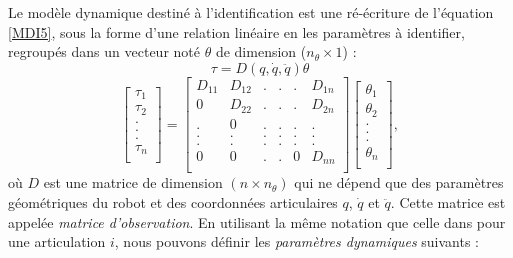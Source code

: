 \documentclass[12pt,a4paper,twoside]{report}
\begin{document}
Le modèle dynamique destiné à l'identification est une ré-écriture de l'équation \eqref{MDI5}, sous la forme d'une relation linéaire en les paramètres à identifier, regroupés dans un vecteur noté $\theta$ de dimension ($n_\theta \times 1$) :
\begin{equation}
\tau = D(q,\dot{q},\ddot{q}) \theta
\label{Reg1}
\end{equation}
\begin{equation}
\left[
\begin{array}{c}
\tau_1 \\
\tau_2 \\
. \\
. \\
. \\
\tau_n \\
\end{array}
\right] =
\left[
\begin{array}{cccccc}
D_{11} & D_{12} & . & . & . & D_{1n} \\
0 & D_{22} & . & . & . & D_{2n} \\
. & 0 & . & . & . & . \\
. & . & . & . & . & . \\
. & . & . & . & . & . \\
0 & 0 & . & . & 0 & D_{nn} \\
\end{array}
\right]
\left[
\begin{array}{c}
\theta_1 \\
\theta_2 \\
. \\
. \\
. \\
\theta_n \\
\end{array}
\right],
\label{Reg2}
\end{equation}
où $D$ est une matrice de dimension $(n\times n_\theta)$ qui ne dépend que des paramètres géométriques du robot et des coordonnées articulaires $q$, $\dot{q}$ et $\ddot{q}$. Cette matrice est appelée \emph{matrice d'observation}. En utilisant la même notation que celle dans pour une articulation $i$, nous pouvons définir les \textit{paramètres dynamiques} suivants :
\end{document}
